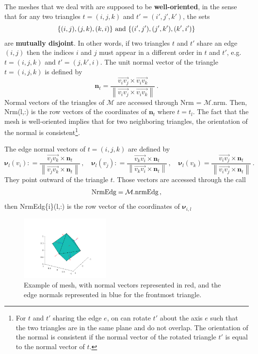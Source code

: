 \documentclass[]{article}
\theoremstyle{definition}
\theoremstyle{remark}
\newcommand{\norm}[1]{\left\|#1\right\|}
\newcommand{\isdef}{\mathrel{\mathop:}=}
\renewcommand*{\vec}[1]{\boldsymbol{#1}}
\begin{document}
The meshes that we deal with are supposed to be {\bf well-oriented}, in the sense that for any two triangles $t = (i,j,k)$ and $t' = (i',j',k')$, the sets
\[ \{(i,j), (j,k), (k,i)\} \textup{ and } \{(i',j'), (j',k'), (k',i')\}\]
are {\bf mutually disjoint}. In other words, if two triangles $t$ and $t'$ share an edge $(i,j)$ then the indices $i$ and $j$ must appear in a different order in $t$ and $t'$, e.g.
$t = (i,j,k)$ and $t' = (j,k',i)$. 
The unit normal vector of the triangle $t = (i,j,k)$ is defined by 
$$\vec n_t = \frac{\overrightarrow{v_iv_j} \times \overrightarrow{v_iv_k}}{\norm{\overrightarrow{v_iv_j} \times \overrightarrow{v_iv_k}}}\,.$$
Normal vectors of the triangles of $\mathcal{M}$ are accessed through Nrm = $\mathcal{M}$.nrm. Then, Nrm(l,:) is the row vectors of the coordinates of $\vec n_t$ where $t = t_l$. 
The fact that the mesh is well-oriented implies that for two neighboring triangles, the orientation of the normal is consistent\footnote{For $t$ and $t'$ sharing the edge $e$, on can rotate $t'$ about the axis $e$ such that the two triangles are in the same plane and do not overlap. The orientation of the normal is consistent if the normal vector of the rotated triangle $t'$ is equal to the normal vector of $t$. }. 

The edge normal vectors of $t = (i,j,k)$ are defined by 
$$\vec \nu_{l}( v_i) \isdef \frac{\overrightarrow{v_jv_k} \times \vec n_t}{\norm{\overrightarrow{v_jv_k} \times \vec n_t}}\,, \quad \vec \nu_{l}( v_j) \isdef \frac{\overrightarrow{v_kv_i} \times \vec n_t}{\norm{\overrightarrow{v_kv_i} \times \vec n_t}}\,, \quad \vec \nu_{l}( v_k) = \frac{\overrightarrow{v_iv_j} \times \vec n_t}{\norm{\overrightarrow{v_iv_j} \times \vec n_t}}\,.$$
They point outward of the triangle $t$. Those vectors are accessed through the call 
\[\textup{NrmEdg}= \mathcal{M}.\textup{nrmEdg}\,,\] 
then NrmEdg\{i\}(l,:) is the row vector of the coordinates of $\vec \nu_{i,l}$ 

\begin{figure}[H]
	\centering
	\includegraphics[width=0.4\textwidth]{mshExample}
	\caption{Example of mesh, with normal vectors represented in red, and the edge normals represented in blue for the frontmost triangle.}
\end{figure}
\end{document}
